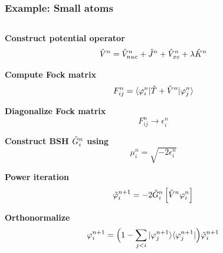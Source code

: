 \begin{frame}
  \frametitle{Example: Small atoms}
  \begin{columns}
    \begin{column}[b]{0.4\textwidth}
      \small
      \centering
      \textbf{Construct potential operator}
      \begin{equation}
        \nonumber
        \hat{V}^n = \hat{V}_{nuc}^n + \hat{J}^n + \hat{V}_{xc}^n + \lambda\hat{K}^n
      \end{equation}

      \vspace{2mm}

      \textbf{Compute Fock matrix}
      \begin{equation}
        \nonumber
        F_{ij}^{n} = \langle\varphi_i^{n}|\hat{T} + \hat{V}^n|\varphi_j^{n}\rangle
      \end{equation}

      \vspace{2mm}

      \textbf{Diagonalize Fock matrix}
      \begin{equation}
        \nonumber
        F_{ij}^n \rightarrow \epsilon_i^n
      \end{equation}

      \vspace{2mm}

      \textbf{Construct BSH $\hat{G}_i^n$ using}
      \begin{equation}
        \nonumber
        \mu_i^n = \sqrt{-2\epsilon_i^n}
      \end{equation}

      \vspace{2mm}

      \textbf{Power iteration}
      \begin{equation}
        \nonumber
        \tilde{\varphi}_i^{n+1} = -2\hat{G}_i^n \left[\hat{V}^n \varphi_i^n\right]
      \end{equation}

      \vspace{2mm}

      \textbf{Orthonormalize}
      \begin{equation}
        \nonumber
        \varphi_i^{n+1} = \Big(1 - \sum_{j<i}|\varphi_j^{n+1}\rangle\langle\varphi_j^{n+1}|\Big)\tilde{\varphi}_i^{n+1}
      \end{equation}

      \vspace{2mm}


\end{column}
\end{columns}
\end{frame}
